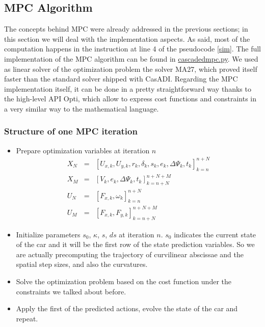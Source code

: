\documentclass[a4paper, onecolumn, 11pt]{article}
\begin{document}
\subsection{MPC Algorithm}
The concepts behind MPC were already addressed in the previous sections; in this
section we will deal with the implementation aspects. As said, most of the
computation happens in the instruction at line 4 of the pseudocode \ref{sim}.
The full implementation of the MPC algorithm can be found in
\href{https://github.com/neverorfrog/vehicle-control/tree/main/controllers/mpc}{cascadedmpc.py}.
We used as linear solver of the optimization problem the solver MA27, which
proved itself faster than the standard solver shipped with CasADI. Regarding the
MPC implementation itself, it can be done in a pretty straightforward way thanks
to the high-level API Opti, which allow to express cost functions and
constraints in a very similar way to the mathematical language.\\
\subsubsection*{Structure of one MPC iteration}
\begin{itemize}
    \item Prepare optimization variables at iteration $n$
    \begin{subequations}
        \begin{eqnarray}
            X_N &=& [U_{x,k}, U_{y,k}, r_k, \delta_k, s_k, e_k, \Delta \varPsi_k, t_k]_{k=n}^{n+N} \\
            X_M &=& [V_k, e_k, \Delta \varPsi_k, t_k]_{k=n+N}^{n+N+M} \\
            U_N &=& [F_{x,k}, \omega_k]_{k=n}^{n+N} \\
            U_M &=& [F_{x,k}, F_{y,k}]_{k=n+N}^{n+N+M}
        \end{eqnarray}
    \end{subequations}
    \item Initialize parameters $s_0$, $\kappa$, $s$, $ds$ at iteration $n$.
    $s_0$ indicates the current state of the car and it will be the first row of
    the state prediction variables. So we are actually precomputing the
    trajectory of curvilinear abscissae and the spatial step sizes, and also the
    curvatures.
    \item Solve the optimization problem based on the cost function under the
    constraints we talked about before.
    \item Apply the first of the predicted actions, evolve the state of the car and repeat.

\end{itemize}
\end{document}
